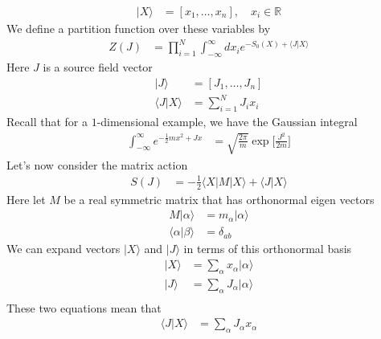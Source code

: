 \documentclass[book.tex]{subfiles}
\begin{document}
\begin{align}
    |X\rangle &= [x_1,\dotsc,x_n],\quad x_i \in \mathbb{R}
\end{align}
We define a partition function over these variables by
\begin{align}
    Z(J) &= \prod_{i=1}^N \int_{-\infty}^{\infty} dx_i e^{-S_0(X) + \langle J | X \rangle}
\end{align}
Here $J$ is a source field vector
\begin{align}
    |J\rangle &= [J_1, \dotsc, J_n] \\
    \langle J | X \rangle &= \sum_{i=1}^N J_i x_i
\end{align}
Recall that for a $1$-dimensional example, we have the Gaussian integral
\begin{align}
    \int_{-\infty}^{\infty} e^{-\frac{1}{2}mx^2 + Jx} &= \sqrt{\frac{2\pi}{m}} \exp \Bigg [ \frac{J^2}{2m} \Bigg ]
\end{align}
Let's now consider the matrix action
\begin{align}
    S(J) &= -\frac{1}{2}\langle X | M | X \rangle + \langle J | X \rangle
\end{align}
Here let $M$ be a real symmetric matrix that has orthonormal eigen vectors
\begin{align}
    M|\alpha \rangle &= m_{\alpha}|\alpha \rangle \\
    \langle \alpha | \beta \rangle &= \delta_{ab}
\end{align}
We can expand vectors $|X\rangle$ and $|J\rangle$ in terms of this orthonormal basis
\begin{align}
    |X\rangle &= \sum_{\alpha}x_\alpha |\alpha \rangle \\
    |J\rangle &= \sum_{\alpha}J_\alpha |\alpha \rangle \\
\end{align}
These two equations mean that
\begin{align}
    \langle J | X \rangle &= \sum_{\alpha}J_\alpha x_\alpha
\end{align}
\end{document}
